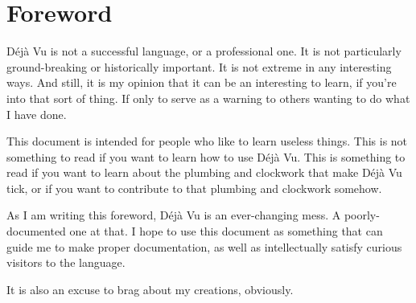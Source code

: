 \chapter{Foreword}

Déjà Vu is not a successful language, or a professional one. It is not
particularly ground-breaking or historically important. It is not
extreme in any interesting ways. And still, it is my opinion that it
can be an interesting to learn, if you're into that sort of thing. If
only to serve as a warning to others wanting to do what I have done.

This document is intended for people who like to learn useless things.
This is not something to read if you want to learn how to use Déjà Vu.
This is something to read if you want to learn about the plumbing and
clockwork that make Déjà Vu tick, or if you want to contribute to that
plumbing and clockwork somehow.

As I am writing this foreword, Déjà Vu is an ever-changing mess. A
poorly-documented one at that. I hope to use this document as something
that can guide me to make proper documentation, as well as
intellectually satisfy curious visitors to the language.

It is also an excuse to brag about my creations, obviously.
